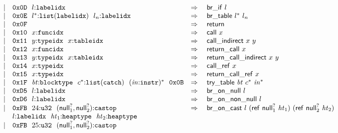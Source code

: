 $$\begin{array}[t]{@{}lrrl@{}l@{}l@{}l@{}}
& & | & \mathtt{0x0D}~~l{:}{\mathtt{labelidx}} & \quad\Rightarrow\quad{} & \mathsf{br\_if}~l \\
& & | & \mathtt{0x0E}~~{l^\ast}{:}{\mathtt{list}}({\mathtt{labelidx}})~~l_n{:}{\mathtt{labelidx}} & \quad\Rightarrow\quad{} & \mathsf{br\_table}~{l^\ast}~l_n \\
& & | & \mathtt{0x0F} & \quad\Rightarrow\quad{} & \mathsf{return} \\
& & | & \mathtt{0x10}~~x{:}{\mathtt{funcidx}} & \quad\Rightarrow\quad{} & \mathsf{call}~x \\
& & | & \mathtt{0x11}~~y{:}{\mathtt{typeidx}}~~x{:}{\mathtt{tableidx}} & \quad\Rightarrow\quad{} & \mathsf{call\_indirect}~x~y \\
& & | & \mathtt{0x12}~~x{:}{\mathtt{funcidx}} & \quad\Rightarrow\quad{} & \mathsf{return\_call}~x \\
& & | & \mathtt{0x13}~~y{:}{\mathtt{typeidx}}~~x{:}{\mathtt{tableidx}} & \quad\Rightarrow\quad{} & \mathsf{return\_call\_indirect}~x~y \\
& & | & \mathtt{0x14}~~x{:}{\mathtt{typeidx}} & \quad\Rightarrow\quad{} & \mathsf{call\_ref}~x \\
& & | & \mathtt{0x15}~~x{:}{\mathtt{typeidx}} & \quad\Rightarrow\quad{} & \mathsf{return\_call\_ref}~x \\
& & | & \mathtt{0x1F}~~{\mathit{bt}}{:}{\mathtt{blocktype}}~~{c^\ast}{:}{\mathtt{list}}({\mathtt{catch}})~~{({\mathit{in}}{:}{\mathtt{instr}})^\ast}~~\mathtt{0x0B} & \quad\Rightarrow\quad{} & \mathsf{try\_table}~{\mathit{bt}}~{c^\ast}~{{\mathit{in}}^\ast} \\
& & | & \mathtt{0xD5}~~l{:}{\mathtt{labelidx}} & \quad\Rightarrow\quad{} & \mathsf{br\_on\_null}~l \\
& & | & \mathtt{0xD6}~~l{:}{\mathtt{labelidx}} & \quad\Rightarrow\quad{} & \mathsf{br\_on\_non\_null}~l \\
& & | & \begin{array}[t]{@{}l@{}} \mathtt{0xFB}~~24{:}{\mathtt{u32}}~~({{\mathsf{null}}_1^?}, {{\mathsf{null}}_2^?}){:}{\mathtt{castop}} \\
  l{:}{\mathtt{labelidx}}~~{\mathit{ht}}_1{:}{\mathtt{heaptype}}~~{\mathit{ht}}_2{:}{\mathtt{heaptype}} \end{array} & \quad\Rightarrow\quad{} & \mathsf{br\_on\_cast}~l~(\mathsf{ref}~{{\mathsf{null}}_1^?}~{\mathit{ht}}_1)~(\mathsf{ref}~{{\mathsf{null}}_2^?}~{\mathit{ht}}_2) \\
& & | & \begin{array}[t]{@{}l@{}} \mathtt{0xFB}~~25{:}{\mathtt{u32}}~~({{\mathsf{null}}_1^?}, {{\mathsf{null}}_2^?}){:}{\mathtt{castop}} \\

\end{array}
\end{array}$$
